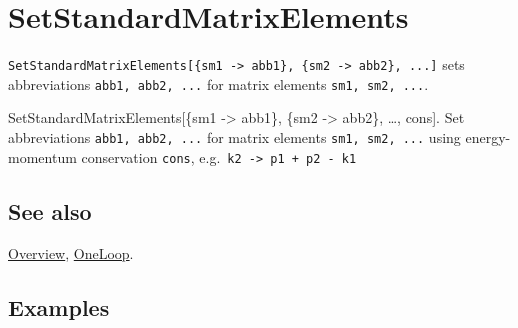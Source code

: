\documentclass[../FeynCalcManual.tex]{subfiles}
\begin{document}
\hypertarget{setstandardmatrixelements}{
\section{SetStandardMatrixElements}\label{setstandardmatrixelements}}

\texttt{SetStandardMatrixElements[\allowbreak{}\{\allowbreak{}sm1 -> abb1\},\ \allowbreak{}\{\allowbreak{}sm2 -> abb2\},\ \allowbreak{}...]}
sets abbreviations \texttt{abb1,\ \allowbreak{}abb2,\ \allowbreak{}...}
for matrix elements \texttt{sm1,\ \allowbreak{}sm2,\ \allowbreak{}...}.

SetStandardMatrixElements{[}\{sm1 -\textgreater{} abb1\}, \{sm2
-\textgreater{} abb2\}, \ldots, cons{]}. Set abbreviations
\texttt{abb1,\ \allowbreak{}abb2,\ \allowbreak{}...} for matrix elements
\texttt{sm1,\ \allowbreak{}sm2,\ \allowbreak{}...} using energy-momentum
conservation \texttt{cons}, e.g.~\texttt{k2 -> p1 + p2 - k1}

\subsection{See also}

\hyperlink{toc}{Overview}, \hyperlink{oneloop}{OneLoop}.

\subsection{Examples}
\end{document}
